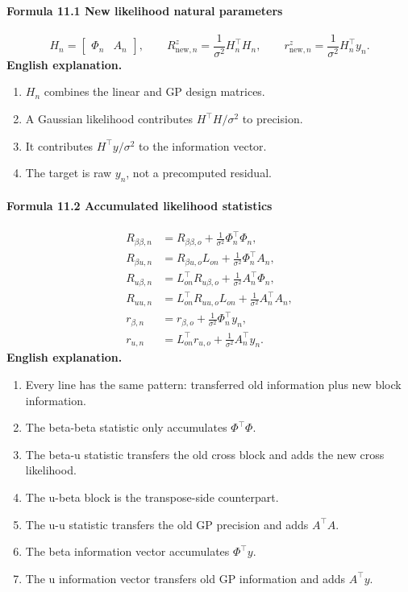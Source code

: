 \documentclass[12pt]{article}
\begin{document}
\paragraph{Formula 11.1 New likelihood natural parameters}
\[
H_n=\begin{bmatrix}\Phi_n&A_n\end{bmatrix},
\qquad
R_{\mathrm{new},n}^z=\frac1{\sigma^2}H_n^\top H_n,
\qquad
r_{\mathrm{new},n}^z=\frac1{\sigma^2}H_n^\top y_n.
\]
\textbf{English explanation.}
\begin{enumerate}[leftmargin=2em]
\item \(H_n\) combines the linear and GP design matrices.
\item A Gaussian likelihood contributes \(H^\top H/\sigma^2\) to precision.
\item It contributes \(H^\top y/\sigma^2\) to the information vector.
\item The target is raw \(y_n\), not a precomputed residual.
\end{enumerate}

\paragraph{Formula 11.2 Accumulated likelihood statistics}
\[
\begin{aligned}
R_{\beta\beta,n}
&=R_{\beta\beta,o}+\frac1{\sigma^2}\Phi_n^\top\Phi_n,\\
R_{\beta u,n}
&=R_{\beta u,o}L_{on}+\frac1{\sigma^2}\Phi_n^\top A_n,\\
R_{u\beta,n}
&=L_{on}^\top R_{u\beta,o}+\frac1{\sigma^2}A_n^\top\Phi_n,\\
R_{uu,n}
&=L_{on}^\top R_{uu,o}L_{on}+\frac1{\sigma^2}A_n^\top A_n,\\
r_{\beta,n}
&=r_{\beta,o}+\frac1{\sigma^2}\Phi_n^\top y_n,\\
r_{u,n}
&=L_{on}^\top r_{u,o}+\frac1{\sigma^2}A_n^\top y_n.
\end{aligned}
\]
\textbf{English explanation.}
\begin{enumerate}[leftmargin=2em]
\item Every line has the same pattern: transferred old information plus new block information.
\item The beta-beta statistic only accumulates \(\Phi^\top\Phi\).
\item The beta-u statistic transfers the old cross block and adds the new cross likelihood.
\item The u-beta block is the transpose-side counterpart.
\item The u-u statistic transfers the old GP precision and adds \(A^\top A\).
\item The beta information vector accumulates \(\Phi^\top y\).
\item The u information vector transfers old GP information and adds \(A^\top y\).
\end{enumerate}
\end{document}
